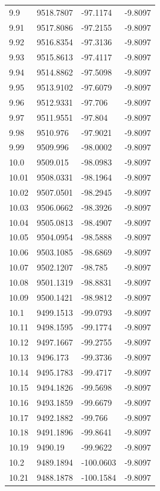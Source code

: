 \begin{table}[H]
\begin{tabular}{llll}
9.9 & 9518.7807 & -97.1174 & -9.8097 \\
9.91 & 9517.8086 & -97.2155 & -9.8097 \\
9.92 & 9516.8354 & -97.3136 & -9.8097 \\
9.93 & 9515.8613 & -97.4117 & -9.8097 \\
9.94 & 9514.8862 & -97.5098 & -9.8097 \\
9.95 & 9513.9102 & -97.6079 & -9.8097 \\
9.96 & 9512.9331 & -97.706 & -9.8097 \\
9.97 & 9511.9551 & -97.804 & -9.8097 \\
9.98 & 9510.976 & -97.9021 & -9.8097 \\
9.99 & 9509.996 & -98.0002 & -9.8097 \\
10.0 & 9509.015 & -98.0983 & -9.8097 \\
10.01 & 9508.0331 & -98.1964 & -9.8097 \\
10.02 & 9507.0501 & -98.2945 & -9.8097 \\
10.03 & 9506.0662 & -98.3926 & -9.8097 \\
10.04 & 9505.0813 & -98.4907 & -9.8097 \\
10.05 & 9504.0954 & -98.5888 & -9.8097 \\
10.06 & 9503.1085 & -98.6869 & -9.8097 \\
10.07 & 9502.1207 & -98.785 & -9.8097 \\
10.08 & 9501.1319 & -98.8831 & -9.8097 \\
10.09 & 9500.1421 & -98.9812 & -9.8097 \\
10.1 & 9499.1513 & -99.0793 & -9.8097 \\
10.11 & 9498.1595 & -99.1774 & -9.8097 \\
10.12 & 9497.1667 & -99.2755 & -9.8097 \\
10.13 & 9496.173 & -99.3736 & -9.8097 \\
10.14 & 9495.1783 & -99.4717 & -9.8097 \\
10.15 & 9494.1826 & -99.5698 & -9.8097 \\
10.16 & 9493.1859 & -99.6679 & -9.8097 \\
10.17 & 9492.1882 & -99.766 & -9.8097 \\
10.18 & 9491.1896 & -99.8641 & -9.8097 \\
10.19 & 9490.19 & -99.9622 & -9.8097 \\
10.2 & 9489.1894 & -100.0603 & -9.8097 \\
10.21 & 9488.1878 & -100.1584 & -9.8097 \\

\end{tabular}
\end{table}
